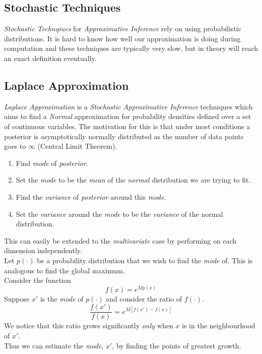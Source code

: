 \documentclass[11pt,a4paper]{article}
\begin{document}
\subsection{Stochastic Techniques}

\textit{Stochastic Technqiues} for \textit{Approximative Inference} rely on using probabilistic distributions. It is hard to know how well our approximation is doing during computation and these techniques are typically very slow, but in theory will reach an exact definition eventually.

\subsection{Laplace Approximation}

\textit{Laplace Approximation} is a \textit{Stochastic Approximative Inference} techniques which aims to find a \textit{Normal} approximation for probability densities defined over a set of continuous variables. The motivation for this is that under most conditions a posterior is asymptotically normally distributed as the number of data points goes to $\infty$ (Central Limit Theorem).\\

\begin{enumerate}
	\item Find \textit{mode} of \textit{posterior}.
	\item Set the \textit{mode} to be the \textit{mean} of the \textit{normal} distribution we are trying to fit.
	\item Find the \textit{variance} of \textit{posterior} around this \textit{mode}.
	\item Set the \textit{variance} around the \textit{mode} to be the \textit{variance} of the normal distribution.
\end{enumerate}
\nb This can easily be extended to the \textit{multivariate} case by performing on each dimension independently.\\

Let $p(\cdot)$ be a probability distribution that we wish to find the \textit{mode} of. This is analogous to find the global maximum.\\
Consider the function
$$f(x)=e^{Mp(x)}$$
Suppose $x'$ is the \textit{mode} of $p(\cdot)$ and consider the ratio of $f(\cdot)$.
$$\frac{f(x')}{f(x)}=e^{M[f(x')-f(x)]}$$
We notice that this ratio grows significantly \textit{only} when $x$ is in the neighbourhood of $x'$.\\
Thus we can estimate the \textit{mode}, $x'$, by finding the points of greatest growth.
\end{document}
